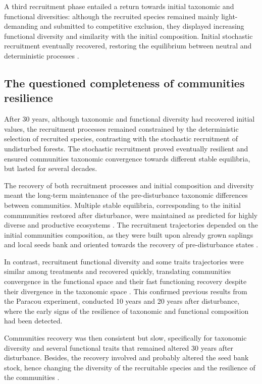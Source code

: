 \documentclass[fleqn,10pt]{ArtEcoFoG} %
\begin{document}
A third recruitment phase entailed a return towards initial taxonomic
and functional diversities: although the recruited species remained
mainly light-demanding and submitted to competitive exclusion, they
displayed increasing functional diversity and similarity with the
initial composition. Initial stochastic recruitment eventually
recovered, restoring the equilibrium between neutral and deterministic
processes \citep{Lawton1988, Chave2004, Mayfield2010}.

\subsection{The questioned completeness of communities
resilience}\label{the-questioned-completeness-of-communities-resilience}

After 30 years, although taxonomic and functional diversity had
recovered initial values, the recruitment processes remained constrained
by the deterministic selection of recruited species, contrasting with
the stochastic recruitment of undisturbed forests. The stochastic
recruitment proved eventually resilient and ensured communities
taxonomic convergence towards different stable equilibria, but lasted
for several decades.

The recovery of both recruitment processes and initial composition and
diversity meant the long-term maintenance of the pre-disturbance
taxonomic differences between communities. Multiple stable equilibria,
corresponding to the initial commmunities restored after disturbance,
were maintained as predicted for highly diverse and productive
ecosystems \citep{Chase2003}. The recruitment trajectories depended on
the initial communities composition, as they were built upon already
grown saplings and local seeds bank and oriented towards the recovery of
pre-disturbance states \citep{Dalling2002, Anderson2007}.

In contrast, recruitment functional diversity and some traits
trajectories were similar among treatments and recovered quickly,
translating communities convergence in the functional space and their
fast functioning recovery despite their divergence in the taxonomic
space \citep{Fukami2005}. This confirmed previous results from the
Paracou experiment, conducted 10 years \citep{Molino2001} and 20 years
\citep{Baraloto2012a} after disturbance, where the early signs of the
resilience of taxonomic and functional composition had been detected.

Communities recovery was then consistent but slow, specifically for
taxonomic diversity and several functional traits that remained altered
30 years after disturbance. Besides, the recovery involved and probably
altered the seed bank stock, hence changing the diversity of the
recruitable species and the resilience of the communities
\citep{Norden2009}.
\end{document}
